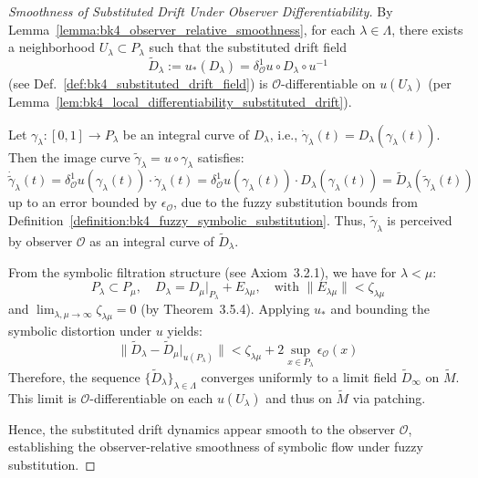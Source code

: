 \begin{proof}[Smoothness of Substituted Drift Under Observer Differentiability]
\label{proof:bk4_substituted_drift_smoothness}
By Lemma~\ref{lemma:bk4_observer_relative_smoothness}, for each $\lambda \in \Lambda$, there exists a neighborhood $U_\lambda \subset P_\lambda$ such that the substituted drift field
\[
\tilde{D}_\lambda := u_*(D_\lambda) = \delta^1_\mathcal{O}u \circ D_\lambda \circ u^{-1}
\]
(see Def.~\ref{def:bk4_substituted_drift_field}) is $\mathcal{O}$-differentiable on $u(U_\lambda)$ (per Lemma~\ref{lem:bk4_local_differentiability_substituted_drift}).

Let $\gamma_\lambda: [0,1] \to P_\lambda$ be an integral curve of $D_\lambda$, i.e., $\dot{\gamma}_\lambda(t) = D_\lambda(\gamma_\lambda(t))$. Then the image curve $\tilde{\gamma}_\lambda = u \circ \gamma_\lambda$ satisfies:
\[
\dot{\tilde{\gamma}}_\lambda(t) = \delta^1_\mathcal{O}u(\gamma_\lambda(t)) \cdot \dot{\gamma}_\lambda(t) = \delta^1_\mathcal{O}u(\gamma_\lambda(t)) \cdot D_\lambda(\gamma_\lambda(t)) = \tilde{D}_\lambda(\tilde{\gamma}_\lambda(t))
\]
up to an error bounded by $\epsilon_\mathcal{O}$, due to the fuzzy substitution bounds from Definition~\ref{definition:bk4_fuzzy_symbolic_substitution}. Thus, $\tilde{\gamma}_\lambda$ is perceived by observer $\mathcal{O}$ as an integral curve of $\tilde{D}_\lambda$.

From the symbolic filtration structure (see Axiom~3.2.1), we have for $\lambda < \mu$:
\[
P_\lambda \subset P_\mu, \quad D_\lambda = D_\mu|_{P_\lambda} + E_{\lambda\mu}, \quad \text{with } \|E_{\lambda\mu}\| < \zeta_{\lambda\mu}
\]
and $\lim_{\lambda, \mu \to \infty} \zeta_{\lambda\mu} = 0$ (by Theorem~3.5.4). Applying $u_*$ and bounding the symbolic distortion under $u$ yields:
\[
\|\tilde{D}_\lambda - \tilde{D}_\mu|_{u(P_\lambda)}\| < \zeta_{\lambda\mu} + 2\sup_{x \in P_\lambda} \epsilon_\mathcal{O}(x)
\]
Therefore, the sequence $\{\tilde{D}_\lambda\}_{\lambda \in \Lambda}$ converges uniformly to a limit field $\tilde{D}_\infty$ on $\tilde{M}$. This limit is $\mathcal{O}$-differentiable on each $u(U_\lambda)$ and thus on $\tilde{M}$ via patching.

Hence, the substituted drift dynamics appear smooth to the observer $\mathcal{O}$, establishing the observer-relative smoothness of symbolic flow under fuzzy substitution.
\end{proof}

